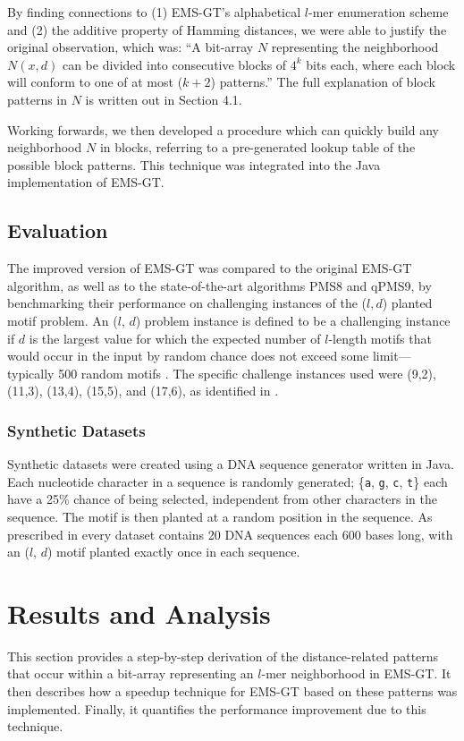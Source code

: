 \documentclass[oneside,12pt]{DISCSthesis}
\begin{document}
{		By finding connections to (1) EMS-GT's alphabetical $l$-mer enumeration scheme and (2) the additive property of Hamming distances, we were able to justify the original observation, which was: ``A bit-array $N$ representing the neighborhood $N(x,d)$ can be divided into consecutive blocks of $4^k$ bits each, where each block will conform to one of at most ($k+2$) patterns.'' The full explanation of block patterns in $N$ is written out in Section 4.1.
		
		Working forwards, we then developed a procedure which can quickly build any neighborhood $N$ in blocks, referring to a pre-generated lookup table of the possible block patterns. This technique was integrated into the Java implementation of EMS-GT.

	\section{Evaluation}
		The improved version of EMS-GT was compared to the original EMS-GT algorithm, as well as to the state-of-the-art algorithms PMS8 and qPMS9, by benchmarking their performance on challenging instances of the ($l, d$) planted motif problem. An ($l$, $d$) problem instance is defined to be a challenging instance if $d$ is the largest value for which the expected number of $l$-length motifs that would occur in the input by random chance does not exceed some limit---typically 500 random motifs \cite{pms2015}. The specific challenge instances used were (9,2), (11,3), (13,4), (15,5), and (17,6), as identified in \cite{pms2015,pms2007}. 

		\subsection{Synthetic Datasets}
			Synthetic datasets were created using a DNA sequence generator written in Java. Each nucleotide character in a sequence is randomly generated; \{\texttt{a}, \texttt{g}, \texttt{c}, \texttt{t}\} each have a 25\% chance of being selected, independent from other characters in the sequence.
			The motif is then planted at a random position in the sequence. As prescribed in \cite{pevzner2000combinatorial} every dataset contains 20 DNA sequences each 600 bases long, with an ($l$, $d$) motif planted exactly once in each sequence.

\chapter{Results and Analysis}
	This section provides a step-by-step derivation of the distance-related patterns that occur within a bit-array representing an $l$-mer neighborhood in EMS-GT. It then describes how a speedup technique for EMS-GT based on these patterns was implemented. Finally, it quantifies the performance improvement due to this technique.
	
}
\end{document}
